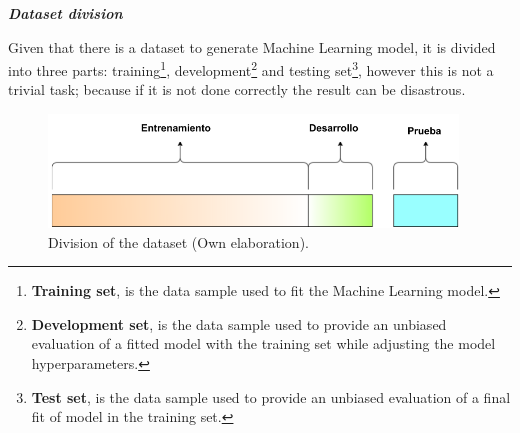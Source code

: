 \vspace{5mm} %

\textbf{\textit{Dataset division}}

\vspace{5mm} %

Given that there is a dataset to generate Machine Learning model, it is divided into three parts: training\footnote{\textbf{Training set}, is the data sample used to fit the Machine Learning model.}, development\footnote{\textbf{Development set}, is the data sample used to provide an unbiased evaluation of a fitted model with the training set while adjusting the model hyperparameters.} and testing set\footnote{\textbf{Test set}, is the data sample used to provide an unbiased evaluation of a final fit of model in the training set.}, however this is not a trivial task; because if it is not done correctly the result can be disastrous.


\vspace{5mm} %

\begin{figure}[h!]
  \begin{center}	\includegraphics[width=0.97\textwidth,frame]{imagenes/Cap3/train-dev-test}
  \caption{Division of the dataset (Own elaboration).}
  \label{fig:train-dev-test}
  \end{center}
\end{figure}

